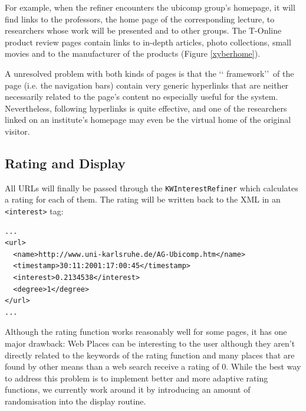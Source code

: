\documentclass[a4paper,twoside]{danarticle}
\theoremstyle{remark}
\begin{document}
      For example, when the refiner encounters the ubicomp group's homepage, it
      will find links to the professors, the home page of the corresponding
      lecture, to researchers whose work will be presented and to other groups.
      The T-Online product review pages contain links to in-depth articles,
      photo collections, small movies and to the manufacturer of the products
      (Figure \ref{xyberhome}).
      
      A unresolved problem with both kinds of pages is that the \lq\lq
      framework\rq\rq\ of the page (i.e. the navigation bars) contain very
      generic hyperlinks that are neither necessarily related to the page's content
      no especially useful for the system.
      Nevertheless, following hyperlinks is quite effective, and one of the
      researchers linked on an institute's homepage may even be the virtual home
      of the original visitor.
    \subsection{Rating and Display}
      All URLs will finally be passed through the \verb$KWInterestRefiner$
      which
      calculates a rating for each of them. The rating will be written back
      to the XML in an \verb$<interest>$ tag:
      
      \begin{verbatim}
...
<url>
  <name>http://www.uni-karlsruhe.de/AG-Ubicomp.htm</name> 
  <timestamp>30:11:2001:17:00:45</timestamp> 
  <interest>0.2134538</interest>
  <degree>1</degree> 
</url>
...
      \end{verbatim}
      
      Although the rating function works reasonably well for some pages, it has
      one major drawback: Web Places can be interesting to the user although
      they aren't directly related to the keywords of the rating function and
      many places that are found by other means than a web search receive
      a rating of 0. While the best way to address this problem is to implement
      better and more adaptive rating functions, we currently work around it by
      introducing an amount of randomisation into the display routine. 
 
\end{document}
